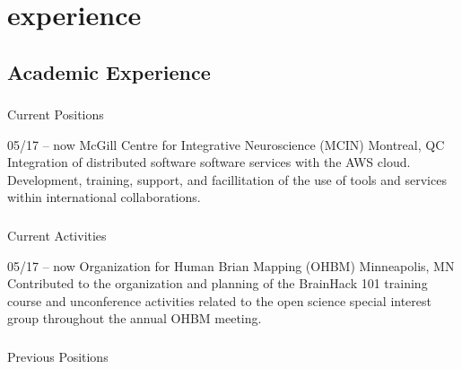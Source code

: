 \documentclass[]{friggeri-cv} %
\begin{document}
\section{experience}

\subsection{Academic Experience}

\subsubsection{}{Current Positions}

\begin{entrylist}
\entry
{05/17 -- now}
{McGill Centre for Integrative Neuroscience (MCIN)}
{Montreal, QC}
{ \\
Integration of distributed software software services with the AWS cloud. Development, training, support, and
facillitation of the use of tools and services within international collaborations.}
\end{entrylist}


\subsubsection{}{Current Activities}

\begin{entrylist}
\entry
{05/17 -- now}
{Organization for Human Brian Mapping (OHBM)}
{Minneapolis, MN}
{ \\
Contributed to the organization and planning of the BrainHack 101 training course and unconference activities related
to the open science special interest group throughout the annual OHBM meeting.}
\end{entrylist}


\subsubsection{}{Previous Positions}
\end{document}
